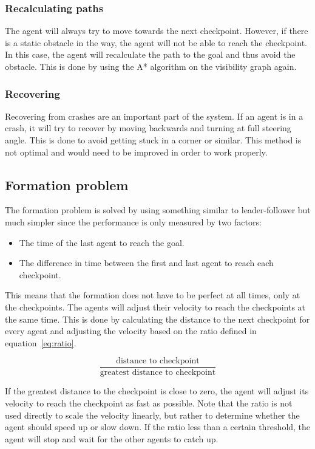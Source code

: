 \documentclass[a4paper,12pt]{article}
\begin{document}
\begin{multicols}{2}
\subsubsection*{Recalculating paths}
The agent will always try to move towards the next checkpoint. However, if there is a static obstacle in the way, the agent will not be able to reach the checkpoint. In this case, the agent will recalculate the path to the goal and thus avoid the obstacle. This is done by using the A* algorithm on the visibility graph again.


\subsubsection*{Recovering}
Recovering from crashes are an important part of the system. If an agent is in a crash, it will try to recover by moving backwards and turning at full steering angle. This is done to avoid getting stuck in a corner or similar. This method is not optimal and would need to be improved in order to work properly.

\subsection*{Formation problem}
The formation problem is solved by using something similar to leader-follower but much simpler since the performance is only measured by two factors:
\begin{itemize}
    \item The time of the last agent to reach the goal.
    \item The difference in time between the first and last agent to reach each checkpoint.
\end{itemize}

This means that the formation does not have to be perfect at all times, only at the checkpoints. The agents will adjust their velocity to reach the checkpoints at the same time. This is done by calculating the distance to the next checkpoint for every agent and adjusting the velocity based on the ratio defined in equation~\ref{eq:ratio}.

\begin{equation} \label{eq:ratio}
  \frac{\text{distance to checkpoint}}{\text{greatest distance to checkpoint}}
\end{equation}

If the greatest distance to the checkpoint is close to zero, the agent will adjust its velocity to reach the checkpoint as fast as possible. Note that the ratio is not used directly to scale the velocity linearly, but rather to determine whether the agent should speed up or slow down. If the ratio less than a certain threshold, the agent will stop and wait for the other agents to catch up.


\end{multicols}
\end{document}
